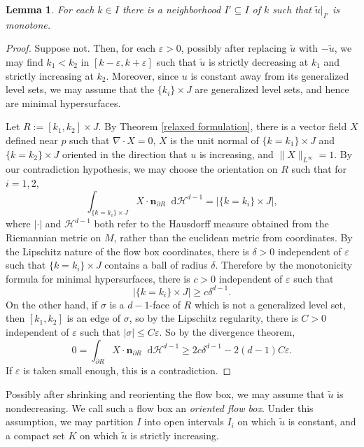 \documentclass[reqno,11pt]{amsart}
\newcommand*\dif{\mathop{}\!\mathrm{d}}
\newcommand{\normal}{\mathbf n}
\newcommand{\dfn}[1]{\emph{#1}\index{#1}}
\newtheorem{lemma}[theorem]{Lemma}
\theoremstyle{definition}
\numberwithin{equation}{section}
\begin{document}
\begin{lemma}
For each $k \in I$ there is a neighborhood $I' \subseteq I$ of $k$ such that $\tilde u|_{I'}$ is monotone.
\end{lemma}
\begin{proof}
Suppose not.
Then, for each $\varepsilon > 0$, possibly after replacing $\tilde u$ with $-\tilde u$, we may find $k_1 < k_2$ in $[k - \varepsilon, k + \varepsilon]$ such that $\tilde u$ is strictly decreasing at $k_1$ and strictly increasing at $k_2$.
Moreover, since $u$ is constant away from its generalized level sets, we may assume that the $\{k_i\} \times J$ are generalized level sets, and hence are minimal hypersurfaces.

Let $R := [k_1, k_2] \times J$.
By Theorem \ref{relaxed formulation}, there is a vector field $X$ defined near $p$ such that $\nabla \cdot X = 0$, $X$ is the unit normal of $\{k = k_1\} \times J$ and $\{k = k_2\} \times J$ oriented in the direction that $u$ is increasing, and $\|X\|_{L^\infty} = 1$.
By our contradiction hypothesis, we may choose the orientation on $R$ such that for $i = 1, 2$,
$$\int_{\{k = k_i\} \times J} X \cdot \normal_{\partial R} \dif \mathcal H^{d - 1} = |\{k = k_i\} \times J|,$$
where $|\cdot|$ and $\mathcal H^{d - 1}$ both refer to the Hausdorff measure obtained from the Riemannian metric on $M$, rather than the euclidean metric from coordinates.
By the Lipschitz nature of the flow box coordinates, there is $\delta > 0$ independent of $\varepsilon$ such that $\{k = k_i\} \times J$ contains a ball of radius $\delta$.
Therefore by the monotonicity formula for minimal hypersurfaces, there is $c > 0$ independent of $\varepsilon$ such that
$$|\{k = k_i\} \times J| \geq c\delta^{d - 1}.$$
On the other hand, if $\sigma$ is a $d - 1$-face of $R$ which is not a generalized level set, then $[k_1, k_2]$ is an edge of $\sigma$, so by the Lipschitz regularity, there is $C > 0$ independent of $\varepsilon$ such that $|\sigma| \leq C\varepsilon$.
So by the divergence theorem, 
$$0 = \int_{\partial R} X \cdot \normal_{\partial R} \dif \mathcal H^{d - 1} \geq 2c\delta^{d - 1} - 2(d - 1)C \varepsilon.$$
If $\varepsilon$ is taken small enough, this is a contradiction.
\end{proof}

Possibly after shrinking and reorienting the flow box, we may assume that $\tilde u$ is nondecreasing.
We call such a flow box an \dfn{oriented flow box}.
Under this assumption, we may partition $I$ into open intervals $I_i$ on which $\tilde u$ is constant, and a compact set $K$ on which $\tilde u$ is strictly increasing.
\end{document}
